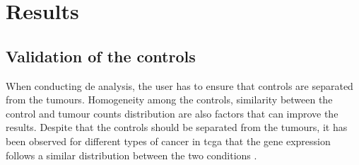 \section{Results}

\subsection{Validation of the controls}

When conducting \acrlong{de} analysis, the user has to ensure that controls are separated from the tumours.
Homogeneity among the controls, similarity between the control and tumour counts distribution are also factors that can improve the results.
Despite that the controls should be separated from the tumours, it has been observed for different types of cancer in \acrshort{tcga} that the gene expression follows a similar distribution between the two conditions \cite*{Decamps2021}.


